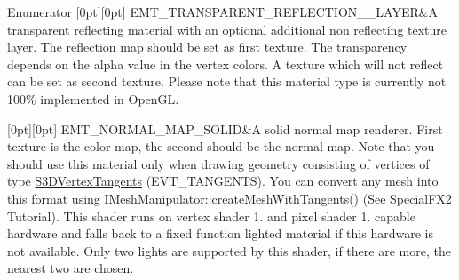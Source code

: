 \begin{DoxyEnumFields}{Enumerator}
[0pt][0pt]{}\mbox{\label{namespaceirr_1_1video_ac8e9b6c66f7cebabd1a6d30cbc5430f1a7d0845dfc024777ddd5f4d8120e7e57a}} 
E\+M\+T\+\_\+\+T\+R\+A\+N\+S\+P\+A\+R\+E\+N\+T\+\_\+\+R\+E\+F\+L\+E\+C\+T\+I\+O\+N\+\_\+\_\+\+L\+A\+Y\+ER&A transparent reflecting material with an optional additional non reflecting texture layer. The reflection map should be set as first texture. The transparency depends on the alpha value in the vertex colors. A texture which will not reflect can be set as second texture. Please note that this material type is currently not 100\% implemented in Open\+GL. \\
\hline

[0pt][0pt]{}\mbox{\label{namespaceirr_1_1video_ac8e9b6c66f7cebabd1a6d30cbc5430f1a6db87c5d5200c00419052ee6d80fb4ca}} 
E\+M\+T\+\_\+\+N\+O\+R\+M\+A\+L\+\_\+\+M\+A\+P\+\_\+\+S\+O\+L\+ID&A solid normal map renderer. First texture is the color map, the second should be the normal map. Note that you should use this material only when drawing geometry consisting of vertices of type \hyperlink{structirr_1_1video_1_1S3DVertexTangents}{S3\+D\+Vertex\+Tangents} (E\+V\+T\+\_\+\+T\+A\+N\+G\+E\+N\+TS). You can convert any mesh into this format using I\+Mesh\+Manipulator\+::create\+Mesh\+With\+Tangents() (See Special\+F\+X2 Tutorial). This shader runs on vertex shader 1. and pixel shader 1. capable hardware and falls back to a fixed function lighted material if this hardware is not available. Only two lights are supported by this shader, if there are more, the nearest two are chosen. \\
\hline


\end{DoxyEnumFields}
